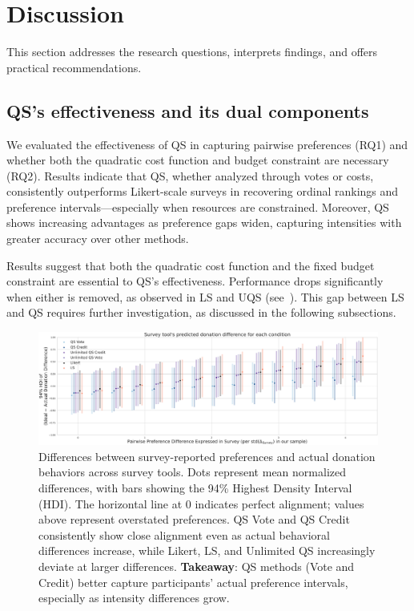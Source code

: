 \section{Discussion}
\label{sec:discussion}
This section addresses the research questions, interprets findings, and offers practical recommendations.

\subsection{QS's effectiveness and its dual components}
We evaluated the effectiveness of QS in capturing pairwise preferences (RQ1) and whether both the quadratic cost function and budget constraint are necessary (RQ2). Results indicate that QS, whether analyzed through votes or costs, consistently outperforms Likert-scale surveys in recovering ordinal rankings and preference intervals—especially when resources are constrained. Moreover, QS shows increasing advantages as preference gaps widen, capturing intensities with greater accuracy over other methods.

Results suggest that both the quadratic cost function and the fixed budget constraint are essential to QS’s effectiveness. Performance drops significantly when either is removed, as observed in LS and UQS (see~). This gap between LS and QS requires further investigation, as discussed in the following subsections.






\begin{figure}[h]
    \centering
    \includegraphics[width=\textwidth]{content/image/posterior_predictive_cumulative.pdf}
    \caption{Differences between survey-reported preferences and actual donation behaviors across survey tools. Dots represent mean normalized differences, with bars showing the 94\% Highest Density Interval (HDI). The horizontal line at 0 indicates perfect alignment; values above represent overstated preferences. QS Vote and QS Credit consistently show close alignment even as actual behavioral differences increase, while Likert, LS, and Unlimited QS increasingly deviate at larger differences. \textbf{Takeaway}: QS methods (Vote and Credit) better capture participants' actual preference intervals, especially as intensity differences grow.}
    \label{fig:comparison}
\end{figure}

